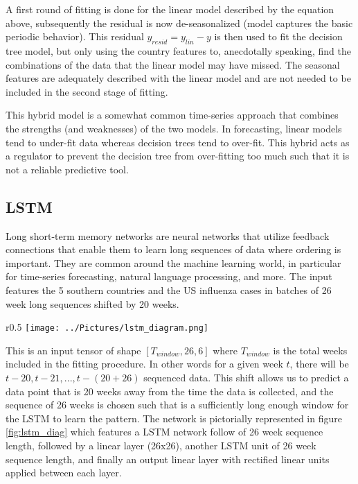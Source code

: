 \documentclass[12pt,a4paper,english]{article}
\begin{document}
A first round of fitting is done for the linear model described by the equation above, subsequently the residual is now de-seasonalized (model captures the basic periodic behavior). This residual $y_{resid} = y_{lin} - y$  is then used to fit the decision tree model, but only using the country features to, anecdotally speaking, find the combinations of the data that the linear model may have missed. The seasonal features are adequately described with the linear model and are not needed to be included in the second stage of fitting.




This hybrid model is a somewhat common time-series approach that combines the strengths (and weaknesses) of the two models. In forecasting, linear models tend to under-fit data whereas decision trees tend to over-fit. This hybrid acts as a regulator to prevent the decision tree from over-fitting too much such that it is not a reliable predictive tool.

\subsection{LSTM}


Long short-term memory networks are neural networks that utilize feedback connections that enable them to learn long sequences of data where ordering is important. They are common around the machine learning world, in particular for time-series forecasting, natural language processing, and more. The input features the 5 southern countries and the US influenza cases in batches of 26 week long sequences shifted by 20 weeks. 

\begin{wrapfigure}{r}{0.5\textwidth}
		\texttt{[image: ../Pictures/lstm\_diagram.png]}
		\caption{A visual representation of the neural network. Features an input followed by LSTM (sequence length = 26), a linear layer (26x26), another LSTM (sequence length = 26), an output layer (output dim = 1), with ReLU activation between each layer.}
		\label{fig:lstm_diag}
	\end{wrapfigure}
	

This is an input tensor of shape $[T_{window},26,6]$ where $T_{window}$ is the total weeks included in the fitting procedure. In other words for a given week $t$, there will be $t-20,t-21,...,t-(20+26)$ sequenced data. This shift allows us to predict a data point that is 20 weeks away from the time the data is collected, and the sequence of 26 weeks is chosen such that is a sufficiently long enough window for the LSTM to learn the pattern. The network is pictorially represented in figure \ref{fig:lstm_diag} which features a LSTM network follow of 26 week sequence length, followed by a linear layer (26x26), another LSTM unit of 26 week sequence length, and finally an output linear layer with rectified linear units applied between each layer.
\end{document}

